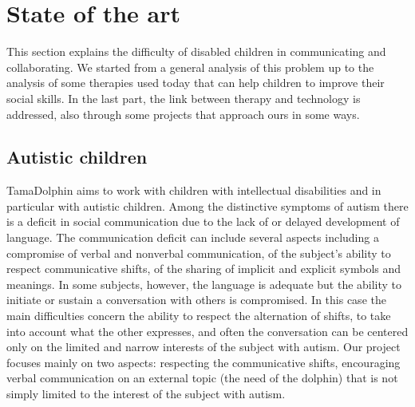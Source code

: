 \documentclass [12pt]{article}
\begin{document}
\section{State of the art}
This section explains the difficulty of disabled children in communicating and collaborating. We started from a general analysis of this problem up to the analysis of some therapies used today that can help children to improve their social skills. In the last part, the link between therapy and technology is addressed, also through some projects that approach ours in some ways.
\subsection{Autistic children}
TamaDolphin aims to work with children with intellectual disabilities and in particular with autistic children. Among the distinctive symptoms of autism there is a deficit in social communication due to the lack of or delayed development of language. The communication deficit can include several aspects including a compromise of verbal and nonverbal communication, of the subject's ability to respect communicative shifts, of the sharing of implicit and explicit symbols and meanings. In some subjects, however, the language is adequate but the ability to initiate or sustain a conversation with others is compromised. In this case the main difficulties concern the ability to respect the alternation of shifts, to take into account what the other expresses, and often the conversation can be centered only on the limited and narrow interests of the subject with autism. Our project focuses mainly on two aspects: respecting the communicative shifts, encouraging verbal communication on an external topic (the need of the dolphin) that is not simply limited to the interest of the subject with autism.  
\end{document}
